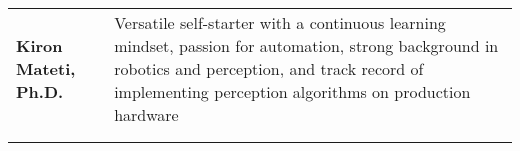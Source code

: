 \begin{tabular}{L{\lcolw} L{\rcolw}}
\textbf{\LARGE {Kiron Mateti, Ph.D.}} 
& {\large Versatile self-starter with a continuous learning mindset, passion for automation, strong background in robotics and perception,  
and track record of implementing perception algorithms on production hardware} 
\\ 
\\
\hline \hline \\ 
\end{tabular}